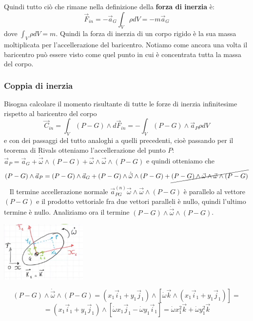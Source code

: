 \newline
Quindi tutto ciò che rimane nella definizione della \textbf{forza di inerzia} è:
\[
    \vec{F}_{in} = - \vec{a}_G \int_V \rho dV = - m \vec{a}_G
\]
dove $\int_V \rho dV = m$.\newline
\newline
Quindi la forza di inerzia di un corpo rigido è la sua massa moltiplicata per l'accellerazione del baricentro. Notiamo come ancora una volta il baricentro può essere visto come quel punto in cui è concentrata tutta la massa del corpo.
\subsubsection*{Coppia di inerzia}
Bisogna calcolare il momento risultante di tutte le forze di inerzia infinitesime rispetto al baricentro del corpo
\[
    \vec{C}_{in} = \int_V (P-G) \land d \vec{F}_{in} =  - \int_V (P-G) \land \vec{a}_P \rho dV
\]
e con dei passaggi del tutto analoghi a quelli precedenti, cioè passando per il teorema di Rivals otteniamo l'accellerazione del punto $P$: $\vec{a}_P = \vec{a}_G + \dot{\vec{\omega}} \land (P-G) + \vec{\omega} \land \vec{\omega} \land (P-G)$ e quindi otteniamo che
\[
    (P-G) \land \vec{a}_P = (P-G) \land \vec{a}_G + (P-G) \land \dot{\vec{\omega}} \land (P-G) + \cancel{(P-G) \land \vec{\omega} \land \vec{\omega} \land (P-G)}
\]
\ \newline
Il termine accellerazione normale $ \vec{a}_{PG}^{(n)} \vec{\omega} \land \vec{\omega} \land (P-G)$ è parallelo al vettore $(P-G)$ e il prodotto vettoriale fra due vettori paralleli è nullo, quindi l'ultimo termine è nullo.\newline
\newline
Analiziamo ora il termine $(P-G) \land \dot{\vec{\omega}} \land (P-G)$.
\begin{center}
    \includegraphics[height=3cm]{../lezione9/img3.JPG}
\end{center}
\[
    (P-G) \land \dot{\vec{\omega}} \land (P-G) = (x_1 \vec{i}_1 + y_1 \vec{j}_1) \land \left[ \dot{\omega} \vec{k} \land (x_1 \vec{i}_1 + y_1 \vec{j}_1) \right] =
\]
\[
    =  (x_1 \vec{i}_1 + y_1 \vec{j}_1) \land \left[ \dot{\omega} x_1 \vec{j}_1 - \dot{\omega} y_1 \vec{i}_1 \right] = \dot{\omega} x_1^2 \vec{k} + \dot{\omega} y_1^2 \vec{k}
\]
